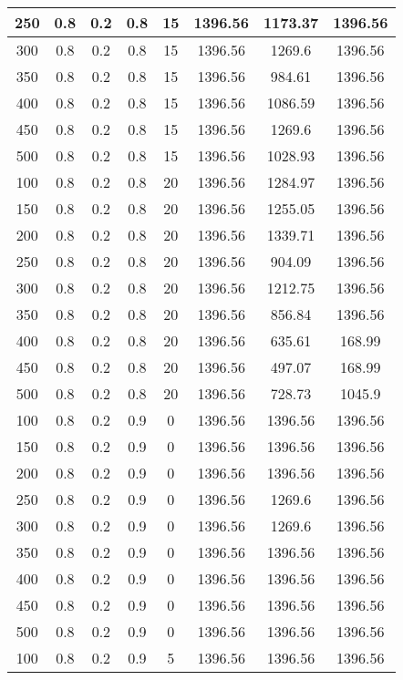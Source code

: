 \documentclass[a4paper, 12pt]{extreport}
\begin{document}
\begin{itemize}
\begin{longtable}{|c|c|c|c|c|c|c|c|}
			250 & 0.8 & 0.2 & 0.8 & 15 & 1396.56 & 1173.37 & 1396.56 \\\hline
			300 & 0.8 & 0.2 & 0.8 & 15 & 1396.56 & 1269.6 & 1396.56 \\\hline
			350 & 0.8 & 0.2 & 0.8 & 15 & 1396.56 & 984.61 & 1396.56 \\\hline
			400 & 0.8 & 0.2 & 0.8 & 15 & 1396.56 & 1086.59 & 1396.56 \\\hline
			450 & 0.8 & 0.2 & 0.8 & 15 & 1396.56 & 1269.6 & 1396.56 \\\hline
			500 & 0.8 & 0.2 & 0.8 & 15 & 1396.56 & 1028.93 & 1396.56 \\\hline
			100 & 0.8 & 0.2 & 0.8 & 20 & 1396.56 & 1284.97 & 1396.56 \\\hline
			150 & 0.8 & 0.2 & 0.8 & 20 & 1396.56 & 1255.05 & 1396.56 \\\hline
			200 & 0.8 & 0.2 & 0.8 & 20 & 1396.56 & 1339.71 & 1396.56 \\\hline
			250 & 0.8 & 0.2 & 0.8 & 20 & 1396.56 & 904.09 & 1396.56 \\\hline
			300 & 0.8 & 0.2 & 0.8 & 20 & 1396.56 & 1212.75 & 1396.56 \\\hline
			350 & 0.8 & 0.2 & 0.8 & 20 & 1396.56 & 856.84 & 1396.56 \\\hline
			400 & 0.8 & 0.2 & 0.8 & 20 & 1396.56 & 635.61 & 168.99 \\\hline
			450 & 0.8 & 0.2 & 0.8 & 20 & 1396.56 & 497.07 & 168.99 \\\hline
			500 & 0.8 & 0.2 & 0.8 & 20 & 1396.56 & 728.73 & 1045.9 \\\hline
			100 & 0.8 & 0.2 & 0.9 & 0 & 1396.56 & 1396.56 & 1396.56 \\\hline
			150 & 0.8 & 0.2 & 0.9 & 0 & 1396.56 & 1396.56 & 1396.56 \\\hline
			200 & 0.8 & 0.2 & 0.9 & 0 & 1396.56 & 1396.56 & 1396.56 \\\hline
			250 & 0.8 & 0.2 & 0.9 & 0 & 1396.56 & 1269.6 & 1396.56 \\\hline
			300 & 0.8 & 0.2 & 0.9 & 0 & 1396.56 & 1269.6 & 1396.56 \\\hline
			350 & 0.8 & 0.2 & 0.9 & 0 & 1396.56 & 1396.56 & 1396.56 \\\hline
			400 & 0.8 & 0.2 & 0.9 & 0 & 1396.56 & 1396.56 & 1396.56 \\\hline
			450 & 0.8 & 0.2 & 0.9 & 0 & 1396.56 & 1396.56 & 1396.56 \\\hline
			500 & 0.8 & 0.2 & 0.9 & 0 & 1396.56 & 1396.56 & 1396.56 \\\hline
			100 & 0.8 & 0.2 & 0.9 & 5 & 1396.56 & 1396.56 & 1396.56 \\\hline

\end{longtable}
\end{itemize}
\end{document}
